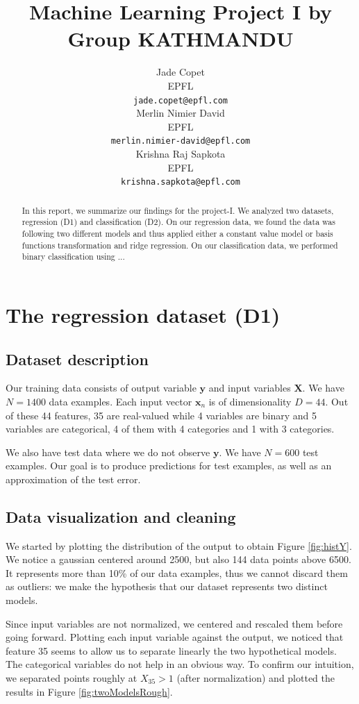 \documentclass{article} %
\title{Machine Learning Project I by Group KATHMANDU}
\author{
Jade Copet\\
EPFL \\
\texttt{jade.copet@epfl.com} \\
\And
Merlin Nimier David\\
EPFL \\
\texttt{merlin.nimier-david@epfl.com} \\
\And
Krishna Raj Sapkota\\
EPFL \\
\texttt{krishna.sapkota@epfl.com} \\
}
\begin{document}
\maketitle



\begin{abstract}
  In this report, we summarize our findings for the project-I. We analyzed two datasets, regression (D1) and classification (D2). On our regression data, we found the data was following two different models and thus applied either a constant value model or basis functions transformation and ridge regression. On our classification data, we performed binary classification using ...
\end{abstract}



\section{The regression dataset (D1)}

  \subsection{Dataset description}
  Our training data consists of output variable $\mathbf{y}$ and input variables $\mathbf{X}$. We have $N = 1400$ data examples. Each input vector $\mathbf{x}_n$ is of dimensionality $D = 44$. Out of these 44 features, 35 are real-valued while 4 variables are binary and 5 variables are categorical, 4 of them with 4 categories and 1 with 3 categories.

  We also have test data where we do not observe $\mathbf{y}$. We have $N = 600$ test examples. Our goal is to produce predictions for test examples, as well as an approximation of the test error.

  \subsection{Data visualization and cleaning}
  We started by plotting the distribution of the output to obtain Figure \ref{fig:histY}. We notice a gaussian centered around 2500, but also 144 data points above 6500. It represents more than 10\% of our data examples, thus we cannot discard them as outliers: we make the hypothesis that our dataset represents two distinct models.

  Since input variables are not normalized, we centered and rescaled them before going forward. Plotting each input variable against the output, we noticed that feature 35 seems to allow us to separate linearly the two hypothetical models. The categorical variables do not help in an obvious way. To confirm our intuition, we separated points roughly at $X_{35} > 1$ (after normalization) and plotted the results in Figure \ref{fig:twoModelsRough}.
\end{document}
